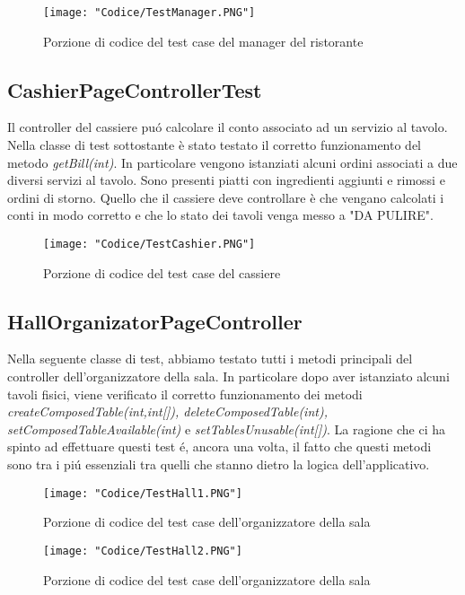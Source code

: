 \documentclass{article}
\begin{document}
\begin{figure}[!h]
\centering
\texttt{[image: "Codice/TestManager.PNG"]}
\caption{Porzione di codice del test case del manager del ristorante}
\end{figure}

\subsection{CashierPageControllerTest}

Il controller del cassiere pu\'o calcolare il conto associato ad un servizio al tavolo. Nella classe di test sottostante è stato testato il corretto funzionamento del metodo \textit{getBill(int)}. In particolare vengono istanziati alcuni ordini associati a due diversi servizi al tavolo. Sono presenti piatti con ingredienti aggiunti e rimossi e ordini di storno. Quello che il cassiere deve controllare è che vengano calcolati i conti in modo corretto e che lo stato dei tavoli venga messo a "DA PULIRE".

\begin{figure}[!h]
\centering
\texttt{[image: "Codice/TestCashier.PNG"]}
\caption{Porzione di codice del test case del cassiere}
\end{figure}

\newpage

\subsection{HallOrganizatorPageController}

Nella seguente classe di test, abbiamo testato tutti i metodi principali del controller dell’organizzatore della sala. In particolare dopo aver istanziato alcuni tavoli fisici, viene verificato il corretto funzionamento dei metodi \textit{createComposedTable(int,int[]), deleteComposedTable(int), setComposedTableAvailable(int)} e \textit{setTablesUnusable(int[])}. La ragione che ci ha spinto ad effettuare questi test \'e, ancora una volta, il fatto che questi metodi sono tra i pi\'u essenziali tra quelli che stanno dietro la logica dell’applicativo.

\begin{figure}[!h]
\centering
\texttt{[image: "Codice/TestHall1.PNG"]}
\caption{Porzione di codice del test case dell'organizzatore della sala}
\end{figure}

\begin{figure}[!h]
\centering
\texttt{[image: "Codice/TestHall2.PNG"]}
\caption{Porzione di codice del test case dell'organizzatore della sala}
\end{figure}
\end{document}
